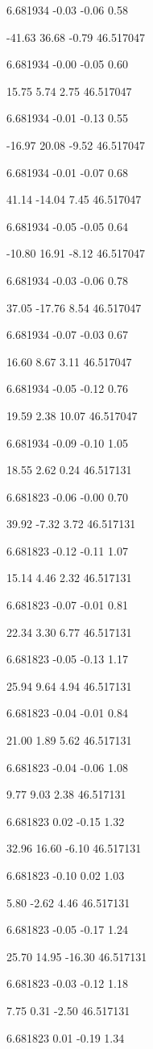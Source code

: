 6.681934
-0.03
-0.06
0.58

-41.63
36.68
-0.79
46.517047

6.681934
-0.00
-0.05
0.60

15.75
5.74
2.75
46.517047

6.681934
-0.01
-0.13
0.55

-16.97
20.08
-9.52
46.517047

6.681934
-0.01
-0.07
0.68

41.14
-14.04
7.45
46.517047

6.681934
-0.05
-0.05
0.64

-10.80
16.91
-8.12
46.517047

6.681934
-0.03
-0.06
0.78

37.05
-17.76
8.54
46.517047

6.681934
-0.07
-0.03
0.67

16.60
8.67
3.11
46.517047

6.681934
-0.05
-0.12
0.76

19.59
2.38
10.07
46.517047

6.681934
-0.09
-0.10
1.05

18.55
2.62
0.24
46.517131

6.681823
-0.06
-0.00
0.70

39.92
-7.32
3.72
46.517131

6.681823
-0.12
-0.11
1.07

15.14
4.46
2.32
46.517131

6.681823
-0.07
-0.01
0.81

22.34
3.30
6.77
46.517131

6.681823
-0.05
-0.13
1.17

25.94
9.64
4.94
46.517131

6.681823
-0.04
-0.01
0.84

21.00
1.89
5.62
46.517131

6.681823
-0.04
-0.06
1.08

9.77
9.03
2.38
46.517131

6.681823
0.02
-0.15
1.32

32.96
16.60
-6.10
46.517131

6.681823
-0.10
0.02
1.03

5.80
-2.62
4.46
46.517131

6.681823
-0.05
-0.17
1.24

25.70
14.95
-16.30
46.517131

6.681823
-0.03
-0.12
1.18

7.75
0.31
-2.50
46.517131

6.681823
0.01
-0.19
1.34

